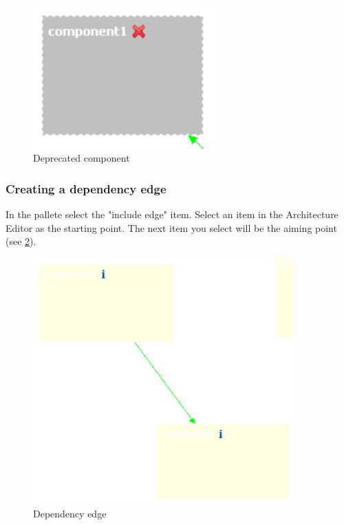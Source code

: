 \begin{figure}[h!]
\begin{center}
\includegraphics[width=7cm]{deprecated.png}
   \caption{Deprecated component}
\label{deprecated}
\end{center}
\end{figure}\par



\subsubsection{Creating a dependency edge}

In the pallete select the "include edge" item. Select an item in the Architecture Editor
as the starting point. The next item you select will be the aiming point (see \ref{include}).

\begin{figure}[h!]
\begin{center}
\includegraphics[width=10cm]{include.png}
   \caption{Dependency edge}
\label{include}
\end{center}
\end{figure}\par

